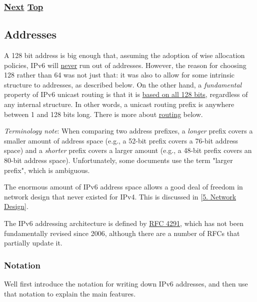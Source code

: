 \documentclass[
]{article}
\begin{document}
\subsubsection{\texorpdfstring{\hyperref[addresses]{Next}
\hyperref[ipv6-basic-technology]{Top}}{Next Top}}\label{next-top-1}

\pagebreak

\subsection{Addresses}\label{addresses}

A 128 bit address is big enough that, assuming the adoption of wise
allocation policies, IPv6 will \href{https://m.xkcd.com/865/}{never} run
out of addresses. However, the reason for choosing 128 rather than 64
was not just that: it was also to allow for some intrinsic structure to
addresses, as described below. On the other hand, a \emph{fundamental}
property of IPv6 unicast routing is that it is
\href{http://www.rfc-editor.org/info/bcp198}{based on all 128 bits},
regardless of any internal structure. In other words, a unicast routing
prefix is anywhere between 1 and 128 bits long. There is more about
\hyperref[routing]{routing} below.

\emph{Terminology note}: When comparing two address prefixes, a
\emph{longer} prefix covers a smaller amount of address space (e.g., a
52-bit prefix covers a 76-bit address space) and a \emph{shorter} prefix
covers a larger amount (e.g., a 48-bit prefix covers an 80-bit address
space). Unfortunately, some documents use the term "larger prefix",
which is ambiguous.

The enormous amount of IPv6 address space allows a good deal of freedom
in network design that never existed for IPv4. This is discussed in
{[}\hyperref[network-design]{5. Network Design}{]}.

The IPv6 addressing architecture is defined by
\href{http://www.rfc-editor.org/info/rfc4291}{RFC 4291}, which has not
been fundamentally revised since 2006, although there are a number of
RFCs that partially update it.

\subsubsection{Notation}\label{notation}

We\textquotesingle ll first introduce the notation for writing down IPv6
addresses, and then use that notation to explain the main features.
\end{document}
